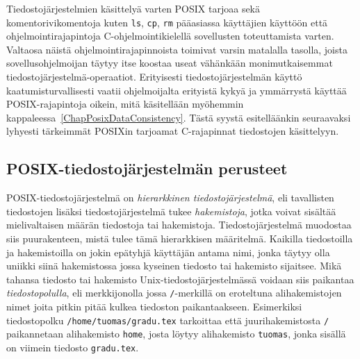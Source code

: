 Tiedostojärjestelmien käsittelyä varten POSIX tarjoaa sekä komentorivikomentoja kuten \texttt{ls}, \texttt{cp}, \texttt{rm} pääasiassa käyttäjien käyttöön että ohjelmointirajapintoja C-ohjelmointikielellä sovellusten toteuttamista varten.
Valtaosa näistä ohjelmointirajapinnoista toimivat varsin matalalla tasolla,
joista sovellusohjelmoijan täytyy itse koostaa useat vähänkään monimutkaisemmat tiedostojärjestelmä-operaatiot.
Erityisesti tiedostojärjestelmän käyttö kaatumisturvallisesti vaatii ohjelmoijalta erityistä kykyä ja ymmärrystä käyttää POSIX-rajapintoja oikein,
mitä käsitellään myöhemmin kappaleessa~\ref{ChapPosixDataConsistency}.
Tästä syystä esitelläänkin seuraavaksi lyhyesti tärkeimmät POSIXin tarjoamat C-rajapinnat tiedostojen käsittelyyn.

\subsection{POSIX-tiedostojärjestelmän perusteet}
POSIX-tiedostojärjestelmä on \emph{hierarkkinen tiedostojärjestelmä},
eli tavallisten tiedostojen lisäksi tiedostojärjestelmä tukee \emph{hakemistoja},
jotka voivat sisältää mielivaltaisen määrän tiedostoja tai hakemistoja.
Tiedostojärjestelmä muodostaa siis puurakenteen, mistä tulee tämä hierarkkisen määritelmä.
Kaikilla tiedostoilla ja hakemistoilla on jokin epätyhjä käyttäjän antama nimi,
jonka täytyy olla uniikki siinä hakemistossa jossa kyseinen tiedosto tai hakemisto sijaitsee.
Mikä tahansa tiedosto tai hakemisto Unix-tiedostojärjestelmässä voidaan siis paikantaa \emph{tiedostopolulla},
eli merkkijonolla jossa \texttt{/}-merkillä on eroteltuna alihakemistojen nimet joita pitkin pitää kulkea tiedoston paikantaakseen.
Esimerkiksi tiedostopolku \texttt{/home/tuomas/gradu.tex}
tarkoittaa että juurihakemistosta \texttt{/} paikannetaan alihakemisto \texttt{home}, josta löytyy alihakemisto \texttt{tuomas}, jonka sisällä on viimein tiedosto \texttt{gradu.tex}.


